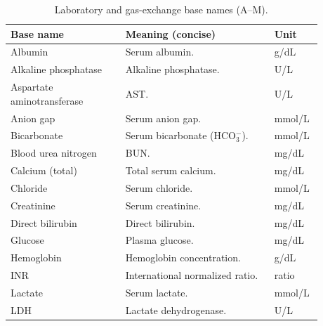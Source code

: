 \vspace{0.75\baselineskip}
\begin{table}[t]\centering
{\small\renewcommand{\arraystretch}{1.12}\setlength{\tabcolsep}{6pt}%
\caption{Laboratory and gas-exchange base names (A--M).}
\label{app:tab-labs-a-m}
\begin{tabular}{P{0.34\linewidth} P{0.44\linewidth} P{0.10\linewidth}}
\toprule
\textbf{Base name} & \textbf{Meaning (concise)} & \textbf{Unit}\\
\midrule
Albumin & Serum albumin. & g/dL\\
Alkaline phosphatase & Alkaline phosphatase. & U/L\\
Aspartate aminotransferase & AST. & U/L\\
Anion gap & Serum anion gap. & mmol/L\\
Bicarbonate & Serum bicarbonate (HCO$_3^-$). & mmol/L\\
Blood urea nitrogen & BUN. & mg/dL\\
Calcium (total) & Total serum calcium. & mg/dL\\
Chloride & Serum chloride. & mmol/L\\
Creatinine & Serum creatinine. & mg/dL\\
Direct bilirubin & Direct bilirubin. & mg/dL\\
Glucose & Plasma glucose. & mg/dL\\
Hemoglobin & Hemoglobin concentration. & g/dL\\
INR & International normalized ratio. & ratio\\
Lactate & Serum lactate. & mmol/L\\
LDH & Lactate dehydrogenase. & U/L\\
\bottomrule
\end{tabular}}
\end{table}

